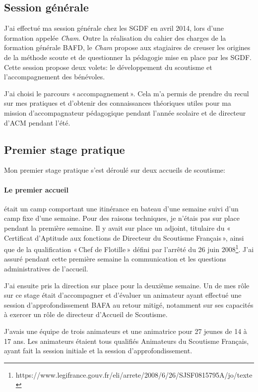 \documentclass[titlepage,11pt,a4paper]{article}
\begin{document}
\subsection{Session générale}

J'ai effectué ma session générale chez les SGDF en avril 2014, lors d'une formation
appelée \emph{Cham}. Outre la réalisation du cahier des charges de la formation générale BAFD,
le \emph{Cham} propose aux stagiaires de creuser les origines de la méthode scoute et de
questionner la pédagogie mise en place par les SGDF\@. Cette session propose deux volets: le
développement du scoutisme et l'accompagnement des bénévoles.

J'ai choisi le parcours «\,accompagnement\,». Cela m'a permis de prendre du recul sur mes
pratiques et d'obtenir des connaissances théoriques utiles pour ma mission
d'accompagnateur pédagogique pendant l'année scolaire et de directeur d'ACM pendant l'été.

\subsection{Premier stage pratique}

Mon premier stage pratique s'est déroulé sur deux accueils de scoutisme:

\paragraph{Le premier accueil} était un camp comportant une itinérance en bateau d'une semaine suivi d'un
camp fixe d'une semaine. Pour des raisons techniques, je n'étais pas sur place pendant la
première semaine. Il y avait sur place un adjoint, titulaire du «\,Certificat d'Aptitude aux fonctions de Directeur
du Scoutisme Français\,», ainsi que de la qualification «\,Chef de Flotille\,» défini par
l'arrêté du 26 juin
2008\footnote{https://www.legifrance.gouv.fr/eli/arrete/2008/6/26/SJSF0815795A/jo/texte}.
J'ai assuré pendant cette première semaine la communication et les questions administratives de
l'accueil.

J'ai ensuite pris la direction sur place pour la deuxième semaine. Un de mes rôle sur ce
stage était d'accompagner et d'évaluer un animateur ayant effectué une session
d'approfondissement BAFA au retour mitigé, notamment sur ses capacités à exercer un rôle
de directeur d'Accueil de Scoutisme.

J'avais une équipe de trois animateurs et une animatrice pour 27 jeunes de 14 à 17 ans. Les animateurs
étaient tous qualifiés Animateurs du Scoutisme Français, ayant fait la session initiale et
la session d'approfondissement.
\end{document}
